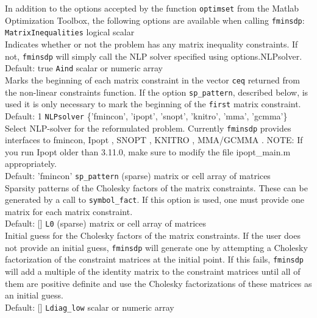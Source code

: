 \documentclass{article}
\begin{document}
In addition to the options accepted by the function \texttt{optimset} from the Matlab Optimization Toolbox, the
following options are available when calling \texttt{fminsdp}:
\vskip 2mm
\noindent \texttt{MatrixInequalities}  \hskip 1cm logical scalar\\
Indicates whether or not the problem has any matrix inequality constraints. If not, \texttt{fminsdp} will simply call the 
NLP solver specified using options.NLPsolver.\\
\noindent  Default: true 
\vskip 2mm
\noindent \texttt{Aind}  \hskip 3.5cm scalar or numeric array\\
Marks the beginning of each matrix constraint in the vector \texttt{ceq} returned from the non-linear constraints function. If
the option \texttt{sp\_pattern}, described below, is used it is only necessary to mark the beginning of the \texttt{first} matrix 
constraint.\\
\noindent  Default: 1
\vskip 2mm
\noindent \texttt{NLPsolver} \hskip 2.5cm  \{'fmincon', 'ipopt', 'snopt', 'knitro', 'mma', 'gcmma'\}               \\
Select NLP-solver for the reformulated problem. Currently \texttt{fminsdp} provides interfaces to fmincon, Ipopt \cite{Wachter:2006}, SNOPT \cite{Gill:2002}, KNITRO \cite{Byrd:2006}, MMA/GCMMA \cite{Svanberg:2007}.
NOTE: If you run Ipopt older than 3.11.0, make sure to modify the file ipopt\_main.m appropriately. \\
Default: 'fmincon'
\vskip 2mm
\noindent \texttt{sp\_pattern}  \hskip 2.3cm  (sparse) matrix or cell array of matrices\\
Sparsity patterns of the Cholesky factors of the matrix constraints. These can be generated by a call to \texttt{symbol\_fact}.  
If this option is used, one must provide one matrix for each matrix constraint. 
\\
\noindent  Default: []
\vskip 2mm
\noindent \texttt{L0} \hskip 3.2cm  (sparse) matrix  or cell array of matrices \\
Initial guess for the Cholesky factors of the matrix constraints. If the user does not provide an initial
guess, \texttt{fminsdp} will generate one by attempting a Cholesky factorization of the constraint matrices 
at the initial point. If this fails, \texttt{fminsdp} will add a multiple of the identity matrix to
the constraint matrices until all of them are positive definite and use the Cholesky factorizations of these
matrices as an initial guess. \\
Default: []
\vskip 2mm
\noindent \texttt{Ldiag\_low} \hskip 2cm  scalar or numeric array	\\
\end{document}
